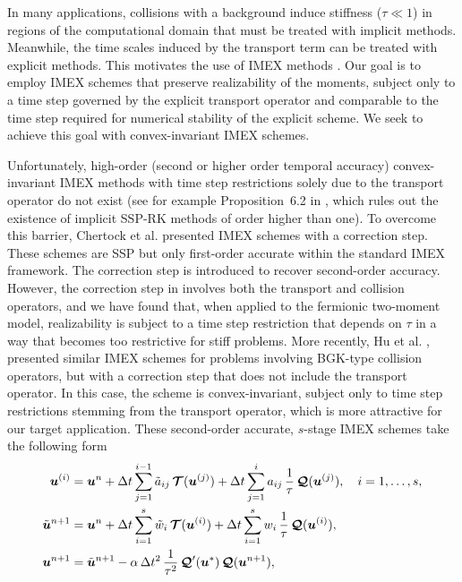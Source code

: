 In many applications, collisions with a background induce stiffness ($\tau\ll1$) in regions of the computational domain that must be treated with implicit methods.  
Meanwhile, the time scales induced by the transport term can be treated with explicit methods.  
This motivates the use of IMEX methods \cite{ascher_etal_1997,pareschiRusso_2005}.  
Our goal is to employ IMEX schemes that preserve realizability of the moments, subject only to a time step governed by the explicit transport operator and comparable to the time step required for numerical stability of the explicit scheme.  
We seek to achieve this goal with convex-invariant IMEX schemes.  

Unfortunately, high-order (second or higher order temporal accuracy) convex-invariant IMEX methods with time step restrictions solely due to the transport operator do not exist (see for example Proposition~6.2 in \cite{gottlieb_etal_2001}, which rules out the existence of implicit SSP-RK methods of order higher than one).  
To overcome this barrier, Chertock et al. \cite{chertock_etal_2015} presented IMEX schemes with a correction step.  
These schemes are SSP but only first-order accurate within the standard IMEX framework.  
The correction step is introduced to recover second-order accuracy.  
However, the correction step in \cite{chertock_etal_2015} involves both the transport and collision operators, and we have found that, when applied to the fermionic two-moment model, realizability is subject to a time step restriction that depends on $\tau$ in a way that becomes too restrictive for stiff problems.  
More recently, Hu et al. \cite{hu_etal_2018}, presented similar IMEX schemes for problems involving BGK-type collision operators, but with a correction step that does not include the transport operator.  
In this case, the scheme is convex-invariant, subject only to time step restrictions stemming from the transport operator, which is more attractive for our target application.  
These second-order accurate, $s$-stage IMEX schemes take the following form \cite{hu_etal_2018}
\begin{align}
  \boldsymbol{u}^{(i)}
  &=\boldsymbol{u}^{n}
  +\Delta t\sum_{j=1}^{i-1}\tilde{a}_{ij}\,\boldsymbol{\mathcal{T}}(\boldsymbol{u}^{(j)})
  +\Delta t\sum_{j=1}^{i}a_{ij}\,\frac{1}{\tau}\,\boldsymbol{\mathcal{Q}}(\boldsymbol{u}^{(j)}),
  \quad i=1,\ldots,s, \label{imexStages} \\
  \tilde{\boldsymbol{u}}^{n+1}
  &=\boldsymbol{u}^{n}
  +\Delta t\sum_{i=1}^{s}\tilde{w}_{i}\,\boldsymbol{\mathcal{T}}(\boldsymbol{u}^{(i)})
  +\Delta t\sum_{i=1}^{s}w_{i}\,\frac{1}{\tau}\,\boldsymbol{\mathcal{Q}}(\boldsymbol{u}^{(i)}), \label{imexIntermediate} \\
  \boldsymbol{u}^{n+1}
  &=\tilde{\boldsymbol{u}}^{n+1}-\alpha\,\Delta t^{2}\,\frac{1}{\tau^{2}}\,\boldsymbol{\mathcal{Q}}'(\boldsymbol{u}^{*})\,\boldsymbol{\mathcal{Q}}(\boldsymbol{u}^{n+1}), \label{eq:imexCorrection}
\end{align}
